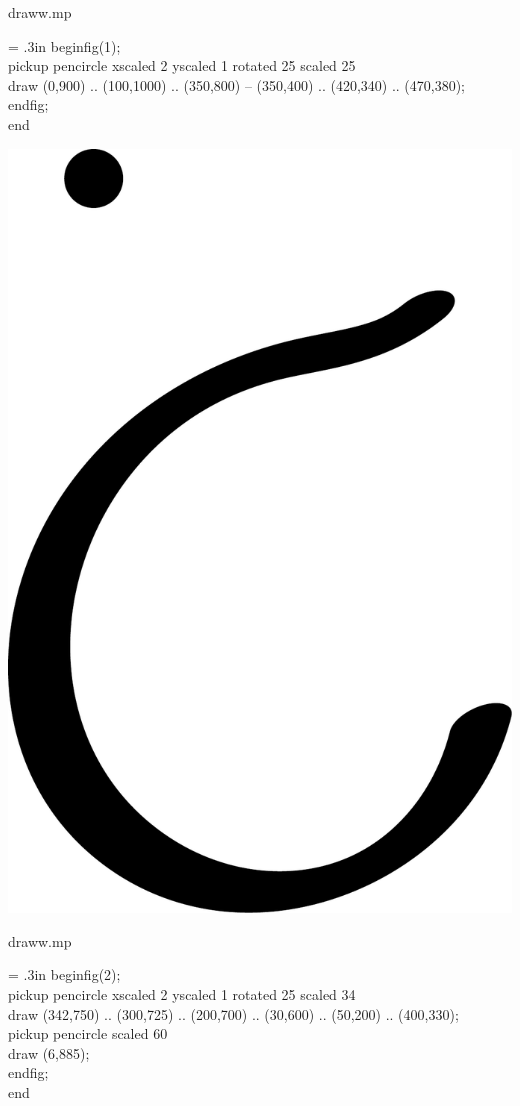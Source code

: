 \documentclass[danish,a2paper,11pt]{scrartcl}
\begin{document}
\begin{multicols*}{3}
\flushleft
\color{White}
\romansmall
draww.mp\\
\vspace{.4cm}
\color{Black}
\typewritersmall
{\leftskip = .3in
beginfig(1);\\
pickup pencircle xscaled 2 yscaled 1 rotated 25 scaled 25\\
draw (0,900) .. (100,1000) .. (350,800) -- (350,400) .. (420,340) .. (470,380);\\
endfig;\\
end
\par}

\center
\includegraphics[scale=.25]{draww-2.pdf}
\vspace{-1cm}

\flushleft
\color{White}
\romansmall
draww.mp\\
\vspace{.4cm}
\color{Black}
\typewritersmall
{\leftskip = .3in
beginfig(2);\\
pickup pencircle xscaled 2 yscaled 1 rotated 25 scaled 34\\
draw (342,750) .. (300,725) .. (200,700) .. (30,600) .. (50,200) .. (400,330);\\
pickup pencircle scaled 60\\
draw (6,885);\\
endfig;\\
end
\par}


\end{multicols*}
\end{document}
